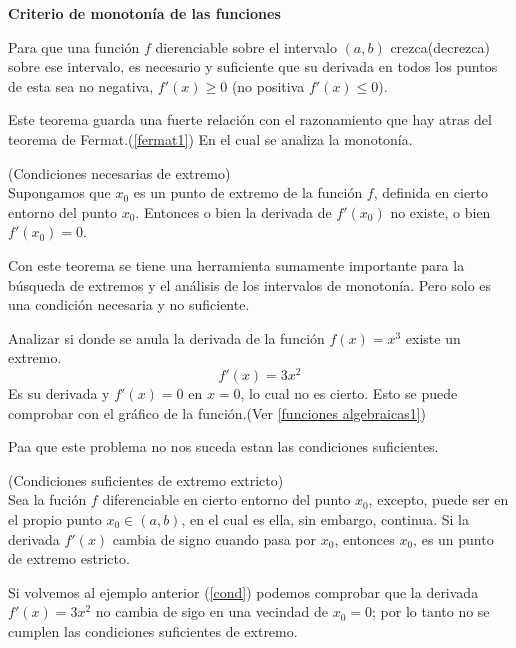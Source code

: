 \documentclass[10pt,twoside]{SelfArx} %
\begin{document}
   \begin{center}
\textbf{Criterio de monotonía de las funciones}
   \end{center}
   \begin{teorema}\label{Criteriomonoton}
   	Para que una función $ f $ dierenciable sobre el intervalo $ (a,b) $ crezca(decrezca) sobre ese intervalo, es necesario y suficiente que su derivada en todos los puntos de esta sea no negativa, $ f'(x)\geq0 $ (no positiva $ f'(x)\leq 0 $).
   \end{teorema}
    Este teorema guarda una fuerte relación con el razonamiento que hay atras del teorema de Fermat.(\ref{fermat1}) En el cual se analiza la monotonía.
   \begin{teorema}
   	(Condiciones necesarias de extremo)\\
   	Supongamos que $ x_{0} $ es un punto de extremo de la funci\'on $ f $, definida en cierto entorno del punto $ x_{0} $. Entonces o bien la derivada de $ f'(x_{0}) $ no existe, o bien $ f'(x_{0})=0 $.
   \end{teorema}
   Con este teorema se tiene una herramienta sumamente importante para la búsqueda de extremos y el análisis de los intervalos de monotonía. Pero solo es una condición necesaria y no suficiente.
   \begin{ejemplo}\label{cond}
   	Analizar si donde se anula la derivada de la función $ f(x)=x^{3}$ existe un extremo.
   	\begin{equation}
   	f'(x)=3x^{2}
   	\end{equation}
   	Es su derivada y $ f'(x)=0 $ en $ x=0 $, lo cual no es cierto. Esto se puede comprobar con el gráfico de la función.(Ver \ref{funciones algebraicas1})
   \end{ejemplo}
   Paa que este problema no nos suceda estan las condiciones suficientes.
   \begin{teorema}\label{CondicioneSuficientExtremo}
   	(Condiciones suficientes de extremo extricto)\\
   	Sea la fución $ f $ diferenciable en cierto entorno del punto $ x_{0} $, excepto, puede ser en el propio punto $ x_{0}\in(a,b)  $, en el cual es ella, sin embargo, continua. Si la derivada $ f'(x) $ cambia de signo cuando pasa por $ x_{0} $, entonces $ x_{0} $, es un punto de extremo estricto.
   \end{teorema}
   Si volvemos al ejemplo anterior (\ref{cond}) podemos comprobar que la derivada $    	f'(x)=3x^{2} $ no cambia de sigo en una vecindad de $ x_{0}=0 $; por lo tanto no se cumplen las condiciones suficientes de extremo.\\
\end{document}
